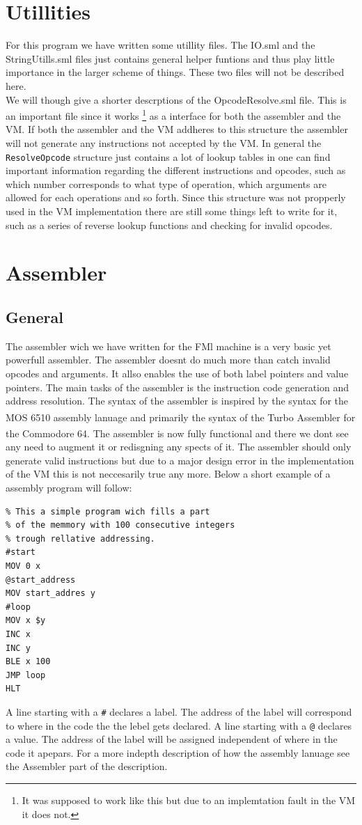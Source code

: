 \documentclass{article}
\newcommand{\V}{\verb}
\begin{document}
\section{Utillities}
For this program we have written some utillity files. The IO.sml and the
StringUtills.sml files just contains general helper funtions and thus play
little importance in the larger scheme of things. These two files will not be
described here.
\\
We will though give a shorter descrptions of the OpcodeResolve.sml file. This is
an important file since it works \footnote{It was supposed to work like this
but due to an implemtation fault in the VM it does not.} as a interface for both
the assembler and the VM. If both the assembler and the VM addheres to this
structure the assembler will not generate any instructions not accepted by the
VM. In general the \V+ResolveOpcode+ structure just contains a lot of lookup
tables in one can find important information regarding the different instructions 
and opcodes, such as which number corresponds to what type of operation, which 
arguments are allowed for each operations and so forth.
Since this structure was not propperly used in the VM implementation there are
still some things left to write for it, such as a series of reverse lookup
functions and checking for invalid opcodes.

\section{Assembler}
\subsection{General}
The assembler wich we have written for the FMl machine is a very basic yet
powerfull assembler. The assembler doesnt do much more than catch invalid
opcodes and arguments. It allso enables the use of both label pointers and value
pointers. The main tasks of the assembler is the instruction code generation and
address resolution. The syntax of the assembler is inspired by the syntax for
the MOS 6510 assembly lanuage and primarily the syntax of the Turbo
Assembler\textsuperscript{\cite{tasm}} for the Commodore
64\textsuperscript{\cite{c64}}. The assembler is now fully functional and there we dont see any need to augment it or redisgning any spects of it. The assembler should
only generate valid instructions but due to a major design error in the
implementation of the VM this is not neccesarily true any more. Below a short
example of a assembly program will follow:
\begin{verbatim}
% This a simple program wich fills a part 
% of the memmory with 100 consecutive integers
% trough rellative addressing.
#start
MOV 0 x
@start_address
MOV start_addres y
#loop
MOV x $y
INC x
INC y
BLE x 100
JMP loop
HLT
\end{verbatim}
A line starting with a \V+#+ declares a label. The address of the label will
correspond to where in the code the the lebel gets declared.
A line starting with a \V+@+ declares a value. The address of the label will be
assigned independent of where in the code it apepars.
For a more indepth description of how the assembly lanuage see the Assembler
part of the description.
\end{document}
